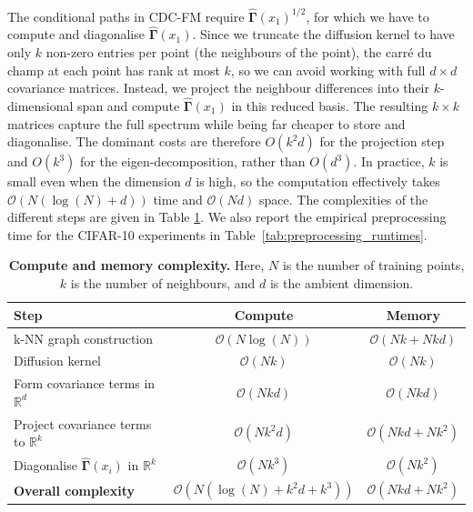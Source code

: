 \documentclass{article} %
\newcommand{\R}{\mathbb{R}}
\newcommand{\G}{\widehat{\mathbf{\Gamma}}}
\begin{document}
The conditional paths in CDC-FM require $\G(x_1)^{1/2}$, for which we have to compute and diagonalise $\G(x_1)$.
Since we truncate the diffusion kernel to have only $k$ non-zero entries per point (the neighbours of the point), the carré du champ at each point has rank at most $k$, so we can avoid
working with full $d\times d$ covariance matrices. 
Instead, we project the neighbour differences into their $k$-dimensional span and compute $\G(x_1)$ in
this reduced basis.
The resulting $k\times k$ matrices capture the full spectrum while being far cheaper to store and diagonalise.
The dominant costs are therefore $O(k^2 d)$ for the projection step and $O(k^3)$ for the eigen-decomposition, rather than $O(d^3)$.
In practice, $k$ is small even when the dimension $d$ is high, so the computation effectively takes $\mathcal{O}(N(\log(N) + d))$ time and $\mathcal{O}(Nd)$ space.
The complexities of the different steps are given in Table \ref{tab:cdc_complexity}. We also report the empirical preprocessing time for the CIFAR-10 experiments in Table~\ref{tab:preprocessing_runtimes}.

\begin{table}[h]
\centering
\caption{\textbf{Compute and memory complexity.}
Here, $N$ is the number of training points, $k$ is the number of neighbours, and $d$ is the ambient dimension.
}
\begin{tabular}{lcc}
\toprule
\textbf{Step} & \textbf{Compute} & \textbf{Memory} \\
\midrule
k-NN graph construction &
$\mathcal{O}(N\log (N))$ 
&
$\mathcal{O}(Nk + Nkd)$ \\
Diffusion kernel &
$\mathcal{O}(Nk)$ &
$\mathcal{O}(Nk)$ \\
Form covariance terms in $\R^d$ &
$\mathcal{O}(Nkd)$ &
$\mathcal{O}(Nkd)$ \\
Project covariance terms to $\R^k$ &
$\mathcal{O}(N k^2 d)$ &
$\mathcal{O}(Nkd + Nk^2)$ \\
Diagonalise $\G(x_i)$ in $\R^k$ &
$\mathcal{O}(N k^3)$ &
$\mathcal{O}(Nk^2)$ \\
\midrule
\textbf{Overall complexity} &
$\mathcal{O}\!\left(N(\log(N) + k^2 d + k^3)\right)$ &
$\mathcal{O}(Nkd + Nk^2)$ \\
\bottomrule
\end{tabular}
\label{tab:cdc_complexity}
\end{table}
\end{document}
